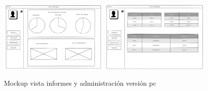 \documentclass[11pt,spanish,listoffigures,listoftables]{tfgetsinf}
\begin{document}
 \begin{figure}[ht!] %
   \includegraphics[width=0.48\textwidth]{img/Vista_Informes_PC.png}
   \includegraphics[width=0.48\textwidth]{img/Vista_Administracion_PC.png}
   \caption{Mockup vista informes y administración versión pc}
   \label{fig:informesPC}
 \end{figure}
\end{document}
